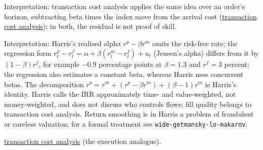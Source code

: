\begin{qfmethod}
 Interpretation: transaction cost analysis applies the same idea over an order's horizon, subtracting beta times the index move from the arrival cost (\hyperref[meth:transaction-cost-analysis]{transaction cost analysis}); in both, the residual is not proof of skill.

 Interpretation: Harris's realised alpha $r^p-\beta r^m$ omits the risk-free rate; the regression form $r^p_t-r^f_t=\alpha+\beta(r^m_t-r^f_t)+u_t$ (Jensen's alpha) differs from it by $(1-\beta)r^f$, for example $-0.9$ percentage points at $\beta=1.3$ and $r^f=3$ percent; the regression also estimates a constant beta, whereas Harris uses concurrent betas. The decomposition $r^p=r^m+(r^p-\beta r^m)+(\beta-1)r^m$ is Harris's identity. Harris calls the IRR approximately time- and value-weighted, not money-weighted, and does not discuss who controls flows; fill quality belongs to transaction cost analysis. Return smoothing is in Harris a problem of fraudulent or careless valuation; for a formal treatment see \nolinkurl{wide-getmansky-lo-makarov}.

 \hyperref[meth:transaction-cost-analysis]{transaction cost analysis} (the execution analogue).

\end{qfmethod}

